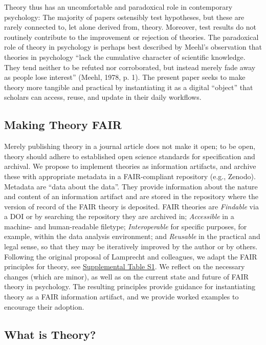 \documentclass[
  man, noextraspace,floatsintext]{apa7}
\begin{document}
Theory thus has an uncomfortable and paradoxical role in contemporary psychology:
The majority of papers ostensibly test hypotheses,
but these are rarely connected to, let alone derived from, theory.
Moreover, test results do not routinely contribute to the improvement or rejection of theories.
The paradoxical role of theory in psychology is perhaps best described by Meehl's observation that theories in psychology ``lack the cumulative character of scientific knowledge. They tend neither to be refuted nor corroborated, but instead merely fade away as people lose interest'' (Meehl, 1978, p. 1).
The present paper seeks to make theory more tangible and practical by instantiating it as a digital ``object'' that scholars can access, reuse, and update in their daily workflows.

\subsection{Making Theory FAIR}\label{making-theory-fair}

Merely publishing theory in a journal article does not make it open;
to be open, theory should adhere to established open science standards for specification and archival.
We propose to implement theories as information artifacts,
and archive these with appropriate metadata in a FAIR-compliant repository (e.g., Zenodo).
Metadata are ``data about the data''.
They provide information about the nature and content of an information artifact and are stored in the repository where the version of record of the FAIR theory is deposited.
FAIR theories are \emph{Findable} via a DOI or by searching the repository they are archived in;
\emph{Accessible} in a machine- and human-readable filetype;
\emph{Interoperable} for specific purposes, for example, within the data analysis environment;
and \emph{Reusable} in the practical and legal sense, so that they may be iteratively improved by the author or by others.
Following the original proposal of Lamprecht and colleagues,
we adapt the FAIR principles for theory, see \href{https://github.com/cjvanlissa/fair_theory/blob/main/fair_principles.csv}{Supplemental Table S1}.
We reflect on the necessary changes (which are minor),
as well as on the current state and future of FAIR theory in psychology.
The resulting principles provide guidance for instantiating theory as a FAIR information artifact,
and we provide worked examples to encourage their adoption.

\subsection{What is Theory?}\label{what-is-theory}
\end{document}
